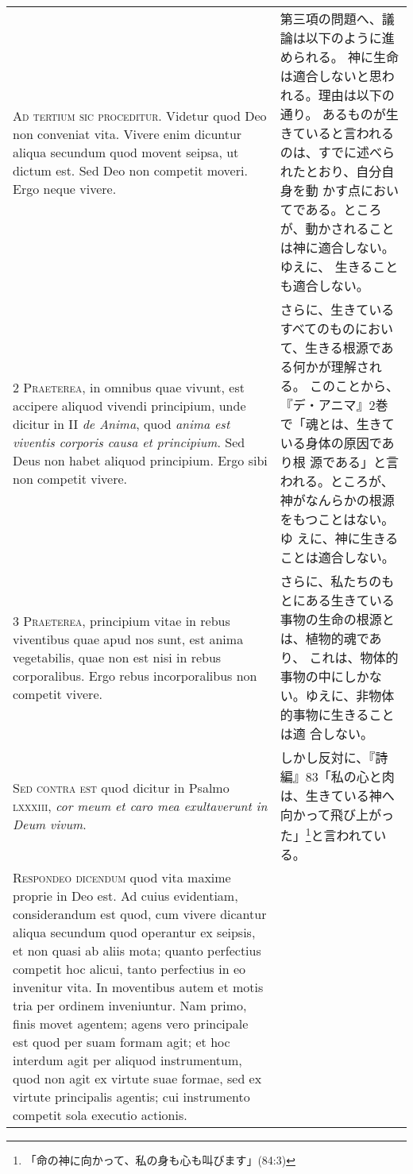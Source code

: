 \documentclass[10pt]{jsarticle} %
\begin{document}
\begin{longtable}{p{21em}p{21em}}


{\huge A}{\scshape d tertium sic proceditur}. Videtur quod Deo non
conveniat vita. Vivere enim dicuntur aliqua secundum quod movent seipsa,
ut dictum est. Sed Deo non competit moveri. Ergo neque vivere.


&
第三項の問題へ、議論は以下のように進められる。
神に生命は適合しないと思われる。理由は以下の通り。
あるものが生きていると言われるのは、すでに述べられたとおり、自分自身を動
 かす点においてである。ところが、動かされることは神に適合しない。ゆえに、
 生きることも適合しない。

\\


{\scshape 2 Praeterea}, in omnibus quae vivunt, est accipere aliquod
vivendi principium, unde dicitur in II {\itshape de Anima}, quod
{\itshape anima est viventis corporis causa et principium}. Sed Deus non
habet aliquod principium. Ergo sibi non competit vivere.


&

さらに、生きているすべてのものにおいて、生きる根源である何かが理解される。
 このことから、『デ・アニマ』2巻で「魂とは、生きている身体の原因であり根
 源である」と言われる。ところが、神がなんらかの根源をもつことはない。ゆ
 えに、神に生きることは適合しない。

\\


{\scshape 3 Praeterea}, principium vitae in rebus viventibus quae apud
nos sunt, est anima vegetabilis, quae non est nisi in rebus
corporalibus. Ergo rebus incorporalibus non competit vivere.


&

さらに、私たちのもとにある生きている事物の生命の根源とは、植物的魂であり、
 これは、物体的事物の中にしかない。ゆえに、非物体的事物に生きることは適
 合しない。

\\


{\scshape Sed contra est} quod dicitur in Psalmo {\scshape lxxxiii},
{\itshape cor meum et caro mea exultaverunt in Deum vivum}.


&


しかし反対に、『詩編』83「私の心と肉は、生きている神へ向かって飛び上がっ
 た」\footnote{「命の神に向かって、私の身も心も叫びます」(84:3)}と言われている。

\\


{\scshape Respondeo dicendum} quod vita maxime proprie in Deo est. Ad
cuius evidentiam, considerandum est quod, cum vivere dicantur aliqua
secundum quod operantur ex seipsis, et non quasi ab aliis mota; quanto
perfectius competit hoc alicui, tanto perfectius in eo invenitur
vita. In moventibus autem et motis tria per ordinem inveniuntur. Nam
primo, finis movet agentem; agens vero principale est quod per suam
formam agit; et hoc interdum agit per aliquod instrumentum, quod non
agit ex virtute suae formae, sed ex virtute principalis agentis; cui
instrumento competit sola executio actionis. 



\end{longtable}
\end{document}
